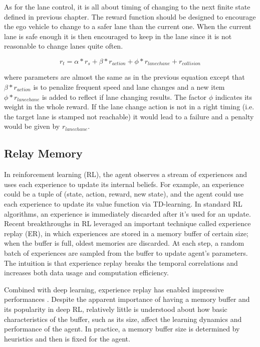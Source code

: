 As for the lane control, it is all about timing of changing to the next finite state defined in previous chapter. The reward function should be designed to encourage the ego vehicle to change to a safer lane than the current one. When the current lane is safe enough it is then encouraged to keep in the lane since it is not reasonable to change lanes quite often.

\begin{equation} \label{eq:reward-func2}
r_t = \alpha * r_s + \beta *  r_{action} + \phi * r_{lanechane}+ r_{collision}
\end{equation}

where parameters are almost the same as in the previous equation except that $\beta *  r_{action}$ is to penalize frequent speed and lane changes and a new item $\phi * r_{lanechane}$ is added to reflect if lane changing results. The factor $\phi$ indicates its weight in the whole reward. If the lane change action is not in a right timing (i.e. the target lane is stamped not reachable) it would lead to a failure and a penalty would be given by $r_{lanechane}$.

\subsection{Relay Memory}

In reinforcement learning (RL), the agent observes a stream of experiences and uses each experience to update its internal beliefs. For example, an experience could be a tuple of (state, action, reward, new state), and the agent could use each experience to update its value function via TD-learning. In standard RL algorithms, an experience is immediately discarded after it's used for an update. Recent breakthroughs in RL leveraged an important technique called experience replay (ER), in which experiences are stored in a memory buffer of certain size; when the buffer is full, oldest memories are discarded. At each step, a random batch of experiences are sampled from the buffer to update agent's parameters. The intuition is that experience replay breaks the temporal correlations and increases both data usage and computation efficiency.

Combined with deep learning, experience replay has enabled impressive performances \cite{Mnih2015AtariNature}. Despite the apparent importance of having a memory buffer and its popularity in deep RL, relatively little is understood about how basic characteristics of the buffer, such as its size, affect the learning dynamics and performance of the agent. In practice, a memory buffer size is determined by heuristics and then is fixed for the agent.

